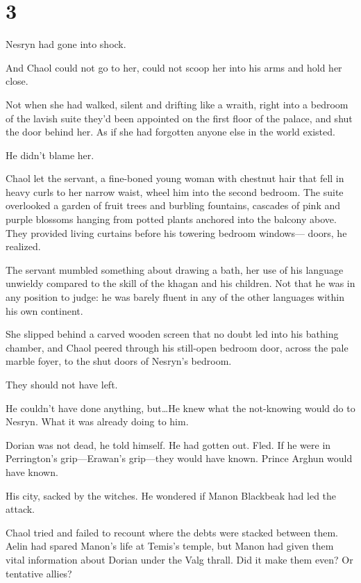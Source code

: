 
\chapter{3}

Nesryn had gone into shock.

And Chaol could not go to her, could not scoop her into his arms and hold her close.

Not when she had walked, silent and drifting like a wraith, right into a bedroom of the lavish suite they'd been appointed on the first floor of the palace, and shut the door behind her. As if she had forgotten anyone else in the world existed.

He didn't blame her.

Chaol let the servant, a fine-boned young woman with chestnut hair that fell in heavy curls to her narrow waist, wheel him into the second bedroom. The suite overlooked a garden of fruit trees and burbling fountains, cascades of pink and purple blossoms hanging from potted plants anchored into the balcony above. They provided living curtains before his towering bedroom windows--- doors, he realized.

The servant mumbled something about drawing a bath, her use of his language unwieldy compared to the skill of the khagan and his children. Not that he was in any position to judge: he was barely fluent in any of the other languages within his own continent.

She slipped behind a carved wooden screen that no doubt led into his bathing chamber, and Chaol peered through his still-open bedroom door, across the pale marble foyer, to the shut doors of Nesryn's bedroom.

They should not have left.

He couldn't have done anything, but\ldots He knew what the not-knowing would do to Nesryn. What it was already doing to him.

Dorian was not dead, he told himself. He had gotten out. Fled. If he were in Perrington's grip---Erawan's grip---they would have known. Prince Arghun would have known.

His city, sacked by the witches. He wondered if Manon Blackbeak had led the attack.

Chaol tried and failed to recount where the debts were stacked between them. Aelin had spared Manon's life at Temis's temple, but Manon had given them vital information about Dorian under the Valg thrall. Did it make them even? Or tentative allies?

